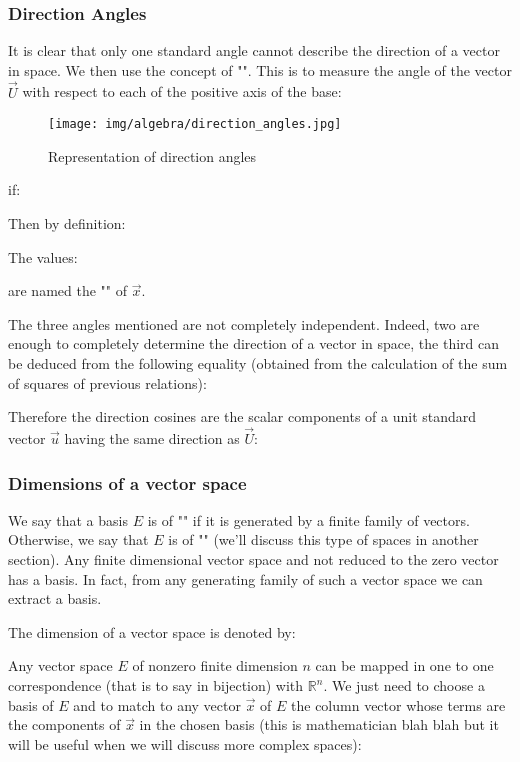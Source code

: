 	\pagebreak
	\subsubsection{Direction Angles}
	It is clear that only one standard angle cannot describe the direction of a vector in space. We then use the concept of "". This is to measure the angle of the vector $\vec{U}$ with respect to each of the positive axis of the base:
	\begin{figure}[H]
		\centering
		\texttt{[image: img/algebra/direction\_angles.jpg]}
		\caption{Representation of direction angles}
	\end{figure}
	if:
	
	Then by definition:
	
	The values:
	
	are named the "\label{cosines directions}" of $\vec{x}$.
	
	The three angles mentioned are not completely independent. Indeed, two are enough to completely determine the direction of a vector in space, the third can be deduced from the following equality (obtained from the calculation of the sum of squares of previous relations):
	
	Therefore the direction cosines are the scalar components of a unit standard vector  $\vec{u}$ having the same direction as $\vec{U}$:
	
	
	\subsubsection{Dimensions of a vector space}
	We say that a basis $E$ is of "" if it is generated by a finite family of vectors. Otherwise, we say that $E$ is of "" (we'll discuss this type of spaces in another section). Any finite dimensional vector space and not reduced to the zero vector has a basis. In fact, from any generating family of such a vector space we can extract a basis.
	
	The dimension of a vector space is denoted by:
	
	Any vector space $E$ of nonzero finite dimension $n$ can be mapped in one to one correspondence (that is to say in bijection) with $\mathbb{R}^n$. We just need to choose a basis of $E$ and to match to any vector $\vec{x}$ of $E$ the column vector whose terms are the components of $\vec{x}$ in the chosen basis (this is  mathematician blah blah but it will be useful when we will discuss more complex spaces):
	

